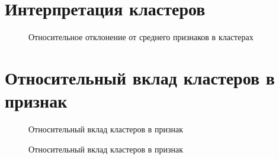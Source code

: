 \documentclass[12pt]{diploma}
\begin{document}
	\section{Интерпретация кластеров \ikmeans}\label{app:A}
	
	\begin{figure}[h!]
		\centering
		\subfigure  {\label{fig:interp-ik-2}}
		\caption{Относительное отклонение от среднего признаков в кластерах}
		\label{fig:interp-ikmeans}
	\end{figure}

	\section{Относительный вклад кластеров в признак}\label{app:B}
	
	\begin{figure}[h!] %
		\centering
		\subfigure[\dePDDP]  {\label{fig:interp-rfc-2}}
		\subfigure[\BiKMR]   {\label{fig:interp-rfc-3}}
		\subfigure[\AWard]   {\label{fig:interp-rfc-4}}
		\caption{Относительный вклад кластеров в признак}
		\label{fig:interp-rfc}
	\end{figure}
	
	\begin{figure}[h!] %
		\centering
		\subfigure[\ikmeans]  {\label{fig:interp-rfc-1}}
		\caption{Относительный вклад кластеров в признак}
		\label{fig:interp-rfc-ikmeans}
	\end{figure}
	

	\titleformat{\section}{\normalfont\fontsize{16}{0}\bfseries}{\thesection}{1em}{}
	
	
	
\end{document}
